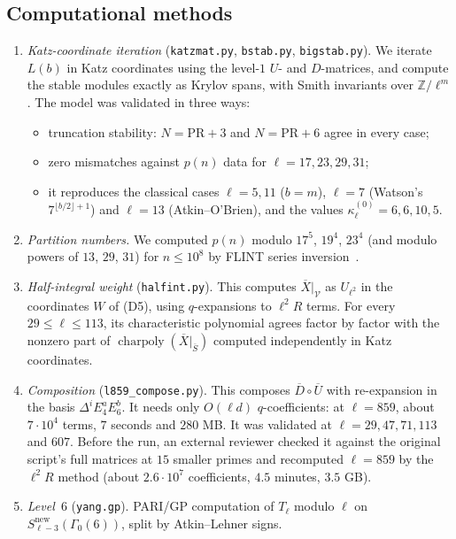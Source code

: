 \documentclass[11pt]{amsart}
\newcommand{\Z}{\mathbb{Z}}
\newcommand{\Sb}{\overline{S}}
\newcommand{\Ub}{\overline{U}}
\newcommand{\Db}{\overline{D}}
\newcommand{\Xb}{\overline{X}}
\newcommand{\cV}{\mathcal{V}}
\DeclareMathOperator{\charpoly}{charpoly}
\theoremstyle{plain}
\theoremstyle{definition}
\numberwithin{equation}{section}
\begin{document}
\subsection{Computational methods}\label{sec:methods}
\begin{enumerate}[label=(M\arabic*)]
\item \emph{Katz-coordinate iteration} (\texttt{katzmat.py}, \texttt{bstab.py}, \texttt{bigstab.py}). We iterate $L(b)$ in Katz coordinates
  using the level-$1$ $U$- and $D$-matrices, and compute the stable modules exactly as Krylov spans, with Smith invariants over
  $\Z/\ell^m$. The model was validated in three ways:
  \begin{itemize}
  \item truncation stability: $N=\mathrm{PR}+3$ and $N=\mathrm{PR}+6$ agree in every case;
  \item zero mismatches against $p(n)$ data for $\ell=17,23,29,31$;
  \item it reproduces the classical cases $\ell=5,11$ ($b=m$), $\ell=7$ (Watson's $7^{\lfloor b/2\rfloor+1}$) and $\ell=13$
    (Atkin--O'Brien), and the values $\kappa^{(0)}_\ell=6,6,10,5$.
  \end{itemize}
\item \emph{Partition numbers.} We computed $p(n)$ modulo $17^5$, $19^4$, $23^4$ (and modulo powers of $13$, $29$, $31$) for $n\le10^8$
  by FLINT series inversion~\cite{FLINT}.
\item \emph{Half-integral weight} (\texttt{halfint.py}). This computes $\Xb|_\cV$ as $U_{\ell^2}$ in the coordinates $W$ of (D5), using
  $q$-expansions to $\ell^2R$ terms. For every $29\le\ell\le113$, its characteristic polynomial agrees factor by factor with the nonzero
  part of $\charpoly(\Xb|_{\Sb})$ computed independently in Katz coordinates.
\item \emph{Composition} (\texttt{l859\_compose.py}). This composes $\Db\circ\Ub$ with re-expansion in the basis $\Delta^iE_4^aE_6^b$. It
  needs only $O(\ell d)$ $q$-coefficients: at $\ell=859$, about $7\cdot10^4$ terms, $7$ seconds and $280$ MB. It was validated at
  $\ell=29,47,71,113$ and $607$. Before the run, an external reviewer checked it against the original script's full matrices at
  $15$ smaller primes and recomputed $\ell=859$ by the $\ell^2R$ method (about $2.6\cdot10^7$ coefficients, $4.5$ minutes, $3.5$ GB).
\item \emph{Level~$6$} (\texttt{yang.gp}). PARI/GP computation of $T_\ell$ modulo $\ell$ on $S^{\mathrm{new}}_{\ell-3}(\Gamma_0(6))$, split by
  Atkin--Lehner signs.
\end{enumerate}
\end{document}
